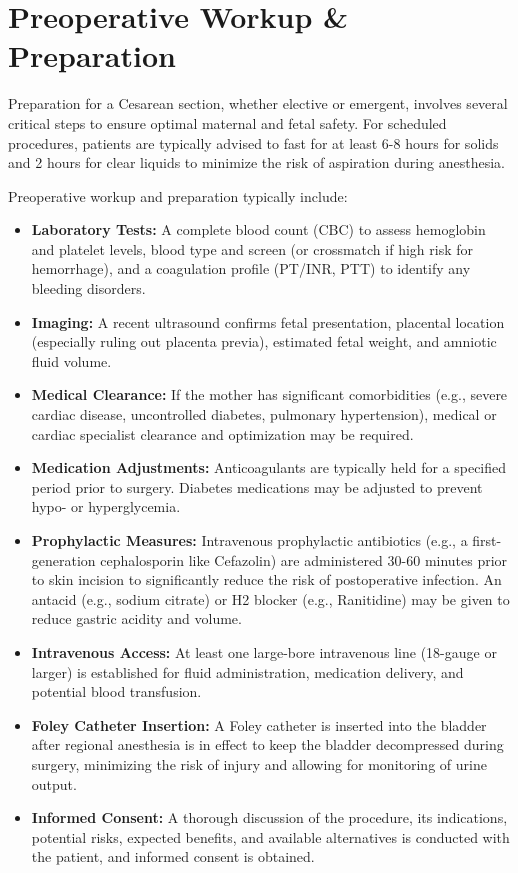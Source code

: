 \section*{Preoperative Workup \& Preparation}
Preparation for a Cesarean section, whether elective or emergent, involves several critical steps to ensure optimal maternal and fetal safety. For scheduled procedures, patients are typically advised to fast for at least 6-8 hours for solids and 2 hours for clear liquids to minimize the risk of aspiration during anesthesia.

Preoperative workup and preparation typically include:

\begin{itemize}
  \item \textbf{Laboratory Tests:} A complete blood count (CBC) to assess hemoglobin and platelet levels, blood type and screen (or crossmatch if high risk for hemorrhage), and a coagulation profile (PT/INR, PTT) to identify any bleeding disorders.
  \item \textbf{Imaging:} A recent ultrasound confirms fetal presentation, placental location (especially ruling out placenta previa), estimated fetal weight, and amniotic fluid volume.
  \item \textbf{Medical Clearance:} If the mother has significant comorbidities (e.g., severe cardiac disease, uncontrolled diabetes, pulmonary hypertension), medical or cardiac specialist clearance and optimization may be required.
  \item \textbf{Medication Adjustments:} Anticoagulants are typically held for a specified period prior to surgery. Diabetes medications may be adjusted to prevent hypo- or hyperglycemia.
  \item \textbf{Prophylactic Measures:} Intravenous prophylactic antibiotics (e.g., a first-generation cephalosporin like Cefazolin) are administered 30-60 minutes prior to skin incision to significantly reduce the risk of postoperative infection. An antacid (e.g., sodium citrate) or H2 blocker (e.g., Ranitidine) may be given to reduce gastric acidity and volume.
  \item \textbf{Intravenous Access:} At least one large-bore intravenous line (18-gauge or larger) is established for fluid administration, medication delivery, and potential blood transfusion.
  \item \textbf{Foley Catheter Insertion:} A Foley catheter is inserted into the bladder after regional anesthesia is in effect to keep the bladder decompressed during surgery, minimizing the risk of injury and allowing for monitoring of urine output.
  \item \textbf{Informed Consent:} A thorough discussion of the procedure, its indications, potential risks, expected benefits, and available alternatives is conducted with the patient, and informed consent is obtained.
\end{itemize}

